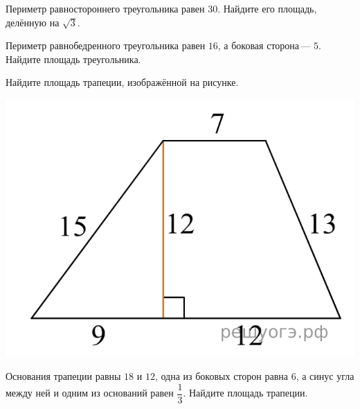 \begin{class}[number=7]
\begin{listofex}
		\item Периметр равностороннего треугольника равен \( 30 \). Найдите его площадь, делённую на \( \sqrt{3} \).
		\item Периметр равнобедренного треугольника равен \( 16 \), а боковая сторона --- \( 5 \). Найдите площадь треугольника.
		\item 
		\begin{minipage}[t]{0.57\textwidth}
			Найдите площадь трапеции, изображённой на рисунке.
		\end{minipage}
		\begin{minipage}[c]{0.3\textwidth}
			\includegraphics[align=t, width=\textwidth]{pics/G91M4L7-3}
		\end{minipage}
		\item Основания трапеции равны \( 18 \) и \( 12 \), одна из боковых сторон равна \( 6 \), а синус угла между ней и одним из оснований равен \( \dfrac{1}{3} \). Найдите площадь трапеции.
		\item 
	\end{listofex}
\end{class}
%
%
%	
